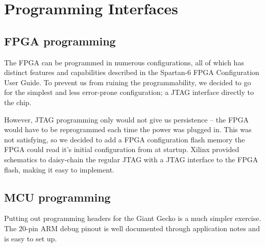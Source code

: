 \section{Programming Interfaces}

\subsection{FPGA programming}
The FPGA can be programmed in numerous configurations, all of which has distinct
features and capabilities described in the Spartan-6 FPGA Configuration User
Guide. To prevent us from ruining the programmability, we decided to go for the
simplest and less error-prone configuration; a JTAG interface directly to the
chip.

However, JTAG programming only would not give us persistence -- the FPGA would
have to be reprogrammed each time the power was plugged in. This was not
satisfying, so we decided to add a FPGA configuration flash memory the FPGA
could read it's initial configuration from at startup. Xilinx provided
schematics to daisy-chain  the regular JTAG with a
JTAG interface to the FPGA flash, making it easy to implement.


\subsection{MCU programming}
Putting out programming headers for the Giant Gecko is a much simpler exercise.
The 20-pin ARM debug pinout is well documented through application notes and is
easy to set up.
